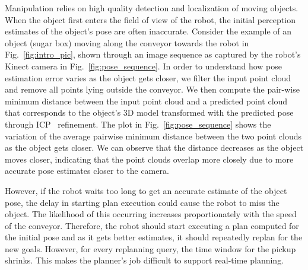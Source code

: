 \documentclass[a4paper,10pt]{article}
\begin{document}
    Manipulation relies on high quality detection and localization of moving objects. When the object first enters the field of view of the robot, the initial perception estimates of the object's pose are often inaccurate. Consider the example of an object (sugar box) moving along the conveyor towards the robot in Fig.~\ref{fig:intro_pic}, shown through an image sequence as captured by the robot's Kinect camera in Fig.~\ref{fig:pose_sequence}. In order to understand how pose estimation error varies as the object gets closer, we filter the input point cloud and remove all points lying outside the conveyor. We then compute the pair-wise minimum distance between the input point cloud and a predicted point cloud that corresponds to the object's 3D model transformed with the predicted pose through ICP~\cite{besl1992method} refinement. The plot in Fig.~\ref{fig:pose_sequence} shows the variation of the average pairwise minimum distance between the two point clouds as the object gets closer. We can observe that the distance decreases as the object moves closer, indicating that the point clouds overlap more closely due to more accurate pose estimates closer to the camera.
    
However, if the robot waits too long to get an accurate estimate of the object pose, the delay in starting plan execution could cause the robot to miss the object. The likelihood of this occurring increases proportionately with the speed of the conveyor. Therefore, the robot should start executing a plan computed for the initial pose and as it gets better estimates, it should repeatedly replan for the new goals. However, for every replanning query, the time window for the pickup shrinks. This makes the planner's job difficult to support real-time planning.
\end{document}
